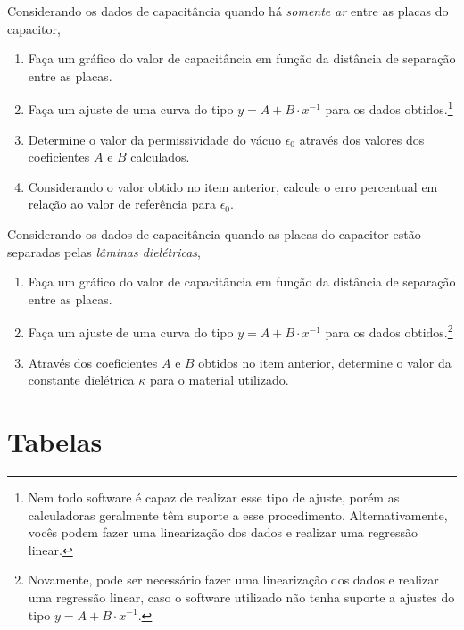 \begin{question}[type={exam}]{4} Considerando os dados de capacitância quando há \emph{somente ar} entre as placas do capacitor,
\begin{enumerate}[label=\roman*.]
    \item Faça um gráfico do valor de capacitância em função da distância de separação entre as placas.
    \item Faça um ajuste de uma curva do tipo $y = A + B \cdot x^{-1}$ para os dados obtidos.\footnote{Nem todo software é capaz de realizar esse tipo de ajuste, porém as calculadoras geralmente têm suporte a esse procedimento. Alternativamente, vocês podem fazer uma linearização dos dados e realizar uma regressão linear.} 
    \item Determine o valor da permissividade do vácuo $\epsilon_0$ através dos valores dos  coeficientes $A$ e $B$ calculados.
    \item Considerando o valor obtido no item anterior, calcule o erro percentual em relação ao valor de referência para $\epsilon_0$.
\end{enumerate}
\end{question}

\begin{question}[type={exam}]{4}
Considerando os dados de capacitância quando as placas do capacitor estão separadas pelas \emph{lâminas dielétricas},
\begin{enumerate}[label=\roman*.]
    \item Faça um gráfico do valor de capacitância em função da distância de separação entre as placas.
    \item Faça um ajuste de uma curva do tipo $y = A + B \cdot x^{-1}$ para os dados obtidos.\footnote{Novamente, pode ser necessário fazer uma linearização dos dados e realizar uma regressão linear, caso o software utilizado não tenha suporte a ajustes do tipo $y = A + B \cdot x^{-1}$.} 
    \item Através dos coeficientes $A$ e $B$ obtidos no item anterior, determine o valor da constante dielétrica $\kappa$ para o material utilizado. 
\end{enumerate}
\end{question}

\vfill
\pagebreak
\section{Tabelas}

